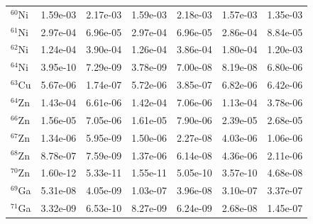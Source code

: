 \begin{table}
\begin{tabular}{l|cc|cc|cc}
$^{60}$Ni & 1.59e-03 & 2.17e-03 & 1.59e-03 & 2.18e-03 & 1.57e-03 & 1.35e-03\\
$^{61}$Ni & 2.97e-04 & 6.96e-05 & 2.97e-04 & 6.96e-05 & 2.86e-04 & 8.84e-05\\
$^{62}$Ni & 1.24e-04 & 3.90e-04 & 1.26e-04 & 3.86e-04 & 1.80e-04 & 1.20e-03\\
$^{64}$Ni & 3.95e-10 & 7.29e-09 & 3.78e-09 & 7.00e-08 & 8.19e-08 & 6.80e-06\\
$^{63}$Cu & 5.67e-06 & 1.74e-07 & 5.72e-06 & 3.85e-07 & 6.82e-06 & 6.42e-06\\
$^{64}$Zn & 1.43e-04 & 6.61e-06 & 1.42e-04 & 7.06e-06 & 1.13e-04 & 3.78e-06\\
$^{66}$Zn & 1.56e-05 & 7.05e-06 & 1.61e-05 & 7.90e-06 & 2.39e-05 & 2.68e-05\\
$^{67}$Zn & 1.34e-06 & 5.95e-09 & 1.50e-06 & 2.27e-08 & 4.03e-06 & 1.06e-06\\
$^{68}$Zn & 8.78e-07 & 7.59e-09 & 1.37e-06 & 6.14e-08 & 4.36e-06 & 2.11e-06\\
$^{70}$Zn & 1.60e-12 & 5.33e-11 & 1.55e-11 & 5.05e-10 & 3.57e-10 & 4.68e-08\\
$^{69}$Ga & 5.31e-08 & 4.05e-09 & 1.03e-07 & 3.96e-08 & 3.10e-07 & 3.37e-07\\
$^{71}$Ga & 3.32e-09 & 6.53e-10 & 8.27e-09 & 6.24e-09 & 2.68e-08 & 1.45e-07\\
\hline
\end{tabular}
\end{table}
\newpage


